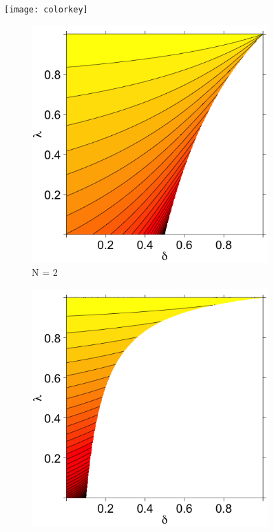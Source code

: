 \documentclass[11pt]{article}
\theoremstyle{definition}
\theoremstyle{definition}
\begin{document}
\begin{figure}[ht!]
\centering
\hspace*{1.2em} 	
\texttt{[image: colorkey]} 
    \centering
    \begin{subfigure}[b]{0.499\textwidth}
        \includegraphics[width=\textwidth]{ExtremeN2}
\caption{N = 2}	
\label{ExtremeN2}
    \end{subfigure}%
    \begin{subfigure}[b]{0.499\textwidth}
        \includegraphics[width=\textwidth]{ExtremeN10}

\end{subfigure}
\end{figure}
\end{document}

